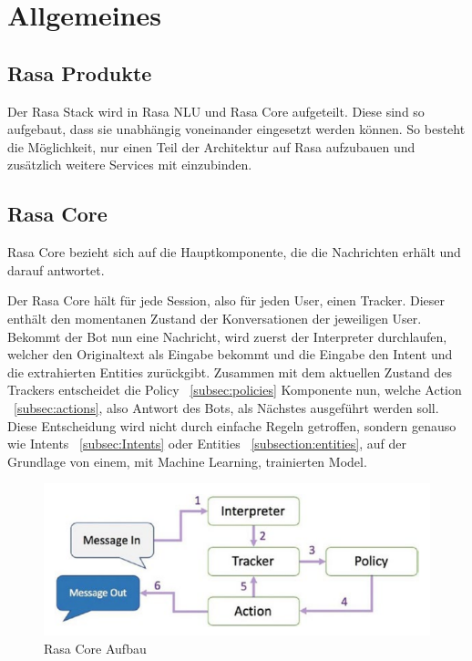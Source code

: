 \section{Allgemeines}\label{sec:overview}

\subsection{Rasa Produkte}\label{sec:rasa-products}

Der Rasa Stack wird in Rasa NLU und Rasa Core aufgeteilt.
Diese sind so aufgebaut, dass sie unabhängig voneinander eingesetzt werden können.
So besteht die Möglichkeit, nur einen Teil der Architektur auf Rasa aufzubauen und zusätzlich weitere Services mit einzubinden.

\subsection{Rasa Core}\label{subsec:rasa-core}

Rasa Core bezieht sich auf die Hauptkomponente, die die Nachrichten erhält und darauf antwortet.\cite{rasaCore}

Der Rasa Core hält für jede Session, also für jeden User, einen Tracker.
Dieser enthält den momentanen Zustand der Konversationen der jeweiligen User.
Bekommt der Bot nun eine Nachricht, wird zuerst der Interpreter durchlaufen, welcher den Originaltext als Eingabe bekommt und die Eingabe den Intent und die extrahierten Entities zurückgibt.
Zusammen mit dem aktuellen Zustand des Trackers entscheidet die Policy ~\ref{subsec:policies} Komponente nun, welche Action ~\ref{subsec:actions}, also Antwort des Bots, als Nächstes ausgeführt werden soll.
Diese Entscheidung wird nicht durch einfache Regeln getroffen, sondern genauso wie Intents ~\ref{subsec:Intents} oder Entities ~\ref{subsection:entities}, auf der Grundlage von einem, mit Machine Learning, trainierten Model.\cite{rasaCore, rasaCoreBook}

\begin{figure}[hbt!]
    \centering
    \includegraphics[scale=0.5]{pics/rasa-core}
    \caption{Rasa Core Aufbau~\cite{rasaCoreBook}}
    \label{fig:rasa_core}
\end{figure}

